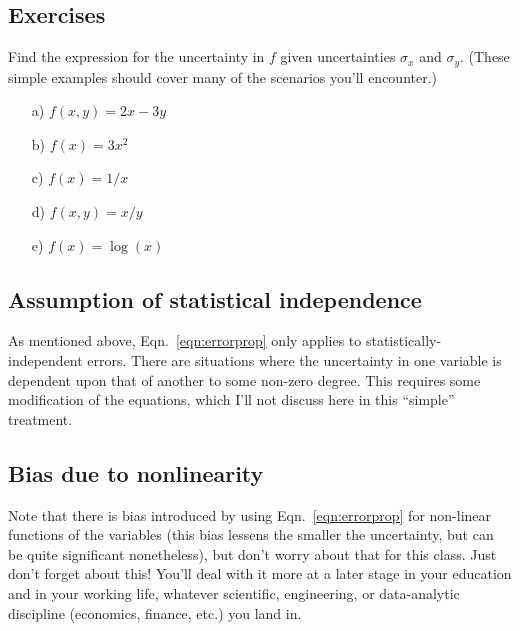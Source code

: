 \documentclass[10pt,letterpaper,twoside]{article}
\begin{document}

\subsection{Exercises}
Find the expression for the uncertainty in $f$ given uncertainties $\sigma_x$ and $\sigma_y$.
(These simple examples should cover many of the scenarios you'll encounter.)
\begin{itemize}
  \item[a)] $f(x,y)=2x-3y$ 
  \item[b)] $f(x)=3x^2$ 
  \item[c)] $f(x)=1/x$ 
  \item[d)] $f(x,y)=x/y$ 
  \item[e)] $f(x)=\log(x)$ 
\end{itemize}

\subsection{Assumption of statistical independence}
As mentioned above, Eqn.~\ref{eqn:errorprop} only applies to statistically-independent errors.
There are situations where the uncertainty in one variable is dependent upon that of another to some non-zero degree.
This requires some modification of the equations, which I'll not discuss here in this ``simple'' treatment.

\subsection{Bias due to nonlinearity}
Note that there is bias introduced by using Eqn.~\ref{eqn:errorprop} for non-linear functions of the variables (this bias lessens the smaller the uncertainty, but can be quite significant nonetheless), but don't worry about that for this class.
Just don't forget about this!
You'll deal with it more at a later stage in your education and in your working life, whatever scientific, engineering, or data-analytic discipline (economics, finance, etc.) you land in.
\end{document}
